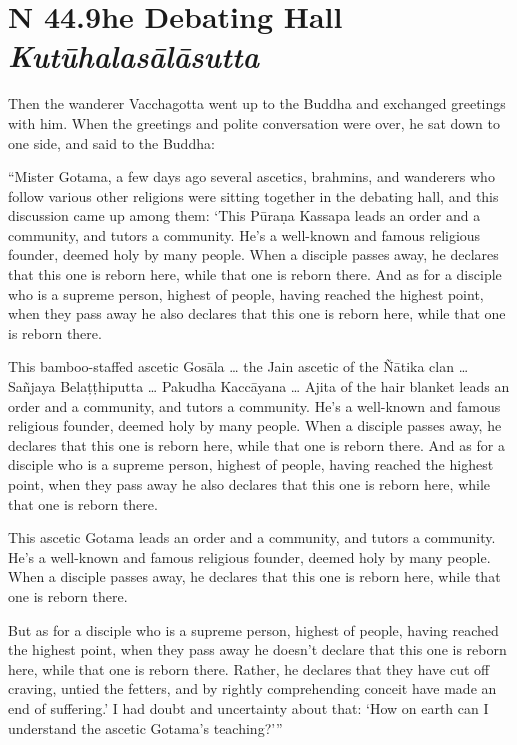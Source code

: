 \documentclass[12pt,openany]{book}%
\newcommand*{\suttatitleacronym}[1]{\smaller[2]{#1}\vspace*{.3em}}
\newcommand*{\suttatitletranslation}[1]{\linebreak{#1}}
\newcommand*{\suttatitleroot}[1]{\linebreak\smaller[2]\itshape{#1}}
\newcommand*{\tocacronym}[1]{\hspace*{-3.3em}{#1}\quad}
\newcommand*{\toctranslation}[1]{#1}
\newcommand*{\tocroot}[1]{(\textit{#1})}
\begin{document}
%
\section*{{\suttatitleacronym SN 44.9}{\suttatitletranslation The Debating Hall }{\suttatitleroot Kutūhalasālāsutta}}
\addcontentsline{toc}{section}{\tocacronym{SN 44.9} \toctranslation{The Debating Hall } \tocroot{Kutūhalasālāsutta}}

Then the wanderer Vacchagotta went up to the Buddha and exchanged greetings with him. When the greetings and polite conversation were over, he sat down to one side, and said to the Buddha: 

“Mister Gotama, a few days ago several ascetics, brahmins, and wanderers who follow various other religions were sitting together in the debating hall, and this discussion came up among them: ‘This \textsanskrit{Pūraṇa} Kassapa leads an order and a community, and tutors a community. He’s a well-known and famous religious founder, deemed holy by many people. When a disciple passes away, he declares that this one is reborn here, while that one is reborn there. And as for a disciple who is a supreme person, highest of people, having reached the highest point, when they pass away he also declares that this one is reborn here, while that one is reborn there. 

This bamboo-staffed ascetic \textsanskrit{Gosāla} … the Jain ascetic of the \textsanskrit{Ñātika} clan … \textsanskrit{Sañjaya} \textsanskrit{Belaṭṭhiputta} … Pakudha \textsanskrit{Kaccāyana} … Ajita of the hair blanket leads an order and a community, and tutors a community. He’s a well-known and famous religious founder, deemed holy by many people. When a disciple passes away, he declares that this one is reborn here, while that one is reborn there. And as for a disciple who is a supreme person, highest of people, having reached the highest point, when they pass away he also declares that this one is reborn here, while that one is reborn there. 

This ascetic Gotama leads an order and a community, and tutors a community. He’s a well-known and famous religious founder, deemed holy by many people. When a disciple passes away, he declares that this one is reborn here, while that one is reborn there. 

But as for a disciple who is a supreme person, highest of people, having reached the highest point, when they pass away he doesn’t declare that this one is reborn here, while that one is reborn there. Rather, he declares that they have cut off craving, untied the fetters, and by rightly comprehending conceit have made an end of suffering.’ I had doubt and uncertainty about that: ‘How on earth can I understand the ascetic Gotama’s teaching?’” 
\end{document}
